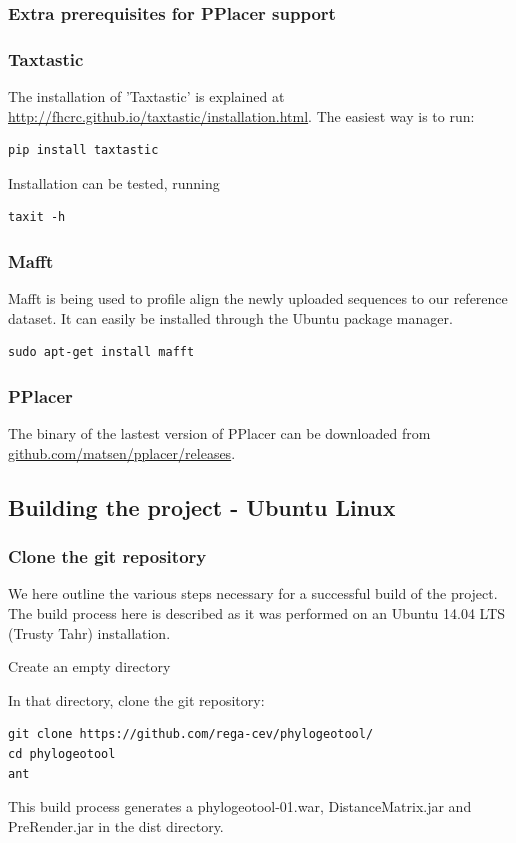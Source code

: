 \documentclass[a4paper, 11pt]{article} %
\begin{document}
\subsubsection{Extra prerequisites for PPlacer support}
\subsubsection*{Taxtastic}
The installation of 'Taxtastic' is explained at \url{http://fhcrc.github.io/taxtastic/installation.html}.
The easiest way is to run:
\begin{verbatim}
pip install taxtastic
\end{verbatim}
Installation can be tested, running
\begin{verbatim}
taxit -h
\end{verbatim}
\subsubsection*{Mafft}
Mafft is being used to profile align the newly uploaded sequences to our reference dataset. It can easily be installed through the Ubuntu package manager.
\begin{verbatim}
sudo apt-get install mafft
\end{verbatim}
\subsubsection*{PPlacer}
The binary of the lastest version of PPlacer can be downloaded from \url{github.com/matsen/pplacer/releases}.

\subsection{Building the project - Ubuntu Linux}

\subsubsection{Clone the git repository}
We here outline the various steps necessary for a successful build of the project.
The build process here is described as it was performed on an Ubuntu 14.04 LTS (Trusty Tahr) installation.
\begin{itemize}
\item Create an empty directory
\item {In that directory, clone the git repository: 
\begin{verbatim}
git clone https://github.com/rega-cev/phylogeotool/
cd phylogeotool
ant
\end{verbatim}
\item This build process generates a phylogeotool-01.war, DistanceMatrix.jar and PreRender.jar in the dist directory.
}
\end{itemize}
\end{document}
